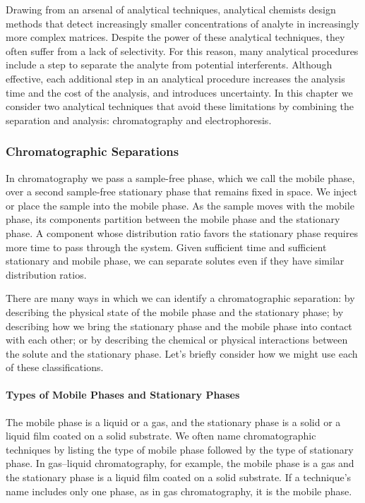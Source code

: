 \documentclass[
]{krantz}
\begin{document}
Drawing from an arsenal of analytical techniques, analytical chemists design methods that detect increasingly smaller concentrations of analyte in increasingly more complex matrices. Despite the power of these analytical techniques, they often suffer from a lack of selectivity. For this reason, many analytical procedures include a step to separate the analyte from potential interferents. Although effective, each additional step in an analytical procedure increases the analysis time and the cost of the analysis, and introduces uncertainty. In this chapter we consider two analytical techniques that avoid these limitations by combining the separation and analysis: chromatography and electrophoresis.

\hypertarget{chromatographic-separations}{%
\subsubsection{Chromatographic Separations}\label{chromatographic-separations}}

In chromatography we pass a sample-free phase, which we call the mobile phase, over a second sample-free stationary phase that remains fixed in space. We inject or place the sample into the mobile phase. As the sample moves with the mobile phase, its components partition between the mobile phase and the stationary phase. A component whose distribution ratio favors the stationary phase requires more time to pass through the system. Given sufficient time and sufficient stationary and mobile phase, we can separate solutes even if they have similar distribution ratios.

There are many ways in which we can identify a chromatographic separation: by describing the physical state of the mobile phase and the stationary phase; by describing how we bring the stationary phase and the mobile phase into contact with each other; or by describing the chemical or physical interactions between the solute and the stationary phase. Let's briefly consider how we might use each of these classifications.

\hypertarget{types-of-mobile-phases-and-stationary-phases}{%
\paragraph{Types of Mobile Phases and Stationary Phases}\label{types-of-mobile-phases-and-stationary-phases}}

The mobile phase is a liquid or a gas, and the stationary phase is a solid or a liquid film coated on a solid substrate. We often name chromatographic techniques by listing the type of mobile phase followed by the type of stationary phase. In gas--liquid chromatography, for example, the mobile phase is a gas and the stationary phase is a liquid film coated on a solid substrate. If a technique's name includes only one phase, as in gas chromatography, it is the mobile phase.
\end{document}
